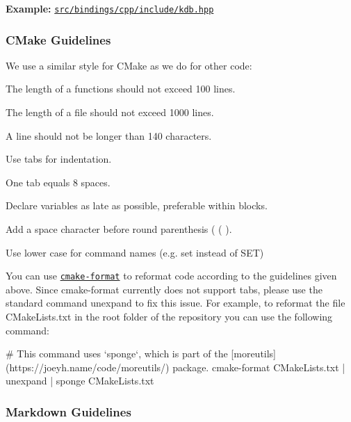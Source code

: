 {\bfseries Example\+:} \href{/home/markus/Projekte/Elektra/current/src/bindings/cpp/include/kdb.hpp}{\tt src/bindings/cpp/include/kdb.\+hpp}

\subsubsection*{C\+Make Guidelines}

We use a similar style for C\+Make as we do for other code\+:


\begin{DoxyItemize}
\item The length of a functions should not exceed 100 lines.
\item The length of a file should not exceed 1000 lines.
\item A line should not be longer than 140 characters.
\item Use tabs for indentation.
\item One tab equals 8 spaces.
\item Declare variables as late as possible, preferable within blocks.
\item Add a space character before round parenthesis ( {\ttfamily (} ).
\item Use lower case for command names (e.\+g. {\ttfamily set} instead of {\ttfamily S\+ET})
\end{DoxyItemize}

You can use \href{https://github.com/cheshirekow/cmake_format}{\tt {\ttfamily cmake-\/format}} to reformat code according to the guidelines given above. Since {\ttfamily cmake-\/format} currently does not support tabs, please use the standard command {\ttfamily unexpand} to fix this issue. For example, to reformat the file {\ttfamily C\+Make\+Lists.\+txt} in the root folder of the repository you can use the following command\+:


\begin{DoxyCode}
# This command uses `sponge`, which is part of the [moreutils](https://joeyh.name/code/moreutils/) package.
cmake-format CMakeLists.txt | unexpand | sponge CMakeLists.txt
\end{DoxyCode}


\subsubsection*{Markdown Guidelines}


